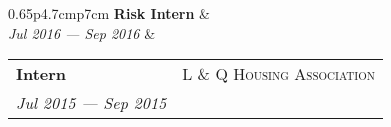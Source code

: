 \documentclass[10pt]{article}
\begin{document}
\begin{minipage}[t]{0.65\linewidth}
\begin{tabularx}{0.65\linewidth}{p{4.7cm}p{7cm}}
\textbf{Risk Intern} &                    \\
\textit{Jul 2016 --- Sep 2016} & \\                 
\end{tabularx}
\vspace{0.1cm}

\begin{tabularx}{0.65\linewidth}{p{4.7cm}p{7cm}}
\textbf{Intern} & \multicolumn{1}{r}{\textsc{L \& Q Housing Association}}                  \\
\textit{Jul 2015 --- Sep 2015} &                  
\end{tabularx}


\end{minipage}
\end{document}
